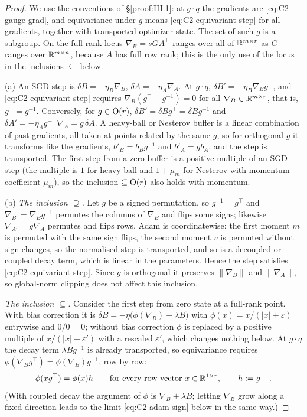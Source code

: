 \begin{proof}
We use the conventions of \S\ref{proof:III.1}: at $g\cdot q$ the gradients are \eqref{eq:C2-gauge-grad}, and equivariance
under $g$ means \eqref{eq:C2-equivariant-step} for all gradients, together with transported optimizer state. The set of
such $g$ is a subgroup. On the full-rank locus $\nabla_B=sGA^\top$ ranges over all of $\R^{m\times r}$ as $G$ ranges over
$\R^{m\times n}$, because $A$ has full row rank; this is the only use of the locus in the inclusions $\subseteq$ below.

(a) An SGD step is $\delta B=-\eta_B\nabla_B$, $\delta A=-\eta_A\nabla_A$. At $g\cdot q$,
$\delta B'=-\eta_B\nabla_Bg^\top$, and \eqref{eq:C2-equivariant-step} requires $\nabla_B(g^\top-g^{-1})=0$ for all
$\nabla_B\in\R^{m\times r}$, that is, $g^\top=g^{-1}$. Conversely, for $g\in\Ort(r)$, $\delta B'=\delta Bg^\top=\delta Bg^{-1}$
and $\delta A'=-\eta_Ag^{-\top}\nabla_A=g\,\delta A$. A heavy-ball or Nesterov buffer is a linear combination of past
gradients, all taken at points related by the same $g$, so for orthogonal $g$ it transforms like the gradients, $b'_B=b_Bg^{-1}$
and $b'_A=gb_A$, and the step is transported. The first step from a zero buffer is a positive multiple of an SGD step (the multiple is $1$ for heavy ball
and $1+\mu_m$ for Nesterov with momentum coefficient $\mu_m$), so the inclusion $\subseteq\Ort(r)$ also holds with momentum.

(b) \emph{The inclusion $\supseteq$.} Let $g$ be a signed permutation, so $g^{-1}=g^\top$ and $\nabla_{B'}=\nabla_Bg^{-1}$
permutes the columns of $\nabla_B$ and flips some signs; likewise $\nabla_{A'}=g\nabla_A$ permutes and flips rows. Adam is
coordinatewise: the first moment $m$ is permuted with the same sign flips, the second moment $v$ is permuted without sign
changes, so the normalised step is transported, and so is a decoupled or coupled decay term, which is linear in the
parameters. Hence the step satisfies \eqref{eq:C2-equivariant-step}. Since $g$ is orthogonal it preserves
$\lVert\nabla_B\rVert$ and $\lVert\nabla_A\rVert$, so global-norm clipping does not affect this inclusion.

\emph{The inclusion $\subseteq$.} Consider the first step from zero state at a full-rank point. With bias correction it is
$\delta B=-\eta\big(\phi(\nabla_B)+\lambda B\big)$ with $\phi(x)=x/(\lvert x\rvert+\varepsilon)$ entrywise and $0/0=0$;
without bias correction $\phi$ is replaced by a positive multiple of $x/(\lvert x\rvert+\varepsilon')$ with a rescaled
$\varepsilon'$, which changes nothing below. At $g\cdot q$ the decay term $\lambda Bg^{-1}$ is already transported, so
equivariance requires $\phi(\nabla_Bg^\top)=\phi(\nabla_B)g^{-1}$, row by row:
\begin{equation}\label{eq:C2-adam-row}
\phi(xg^\top)=\phi(x)h\qquad\text{for every row vector }x\in\R^{1\times r},\qquad h:=g^{-1}.
\end{equation}
(With coupled decay the argument of $\phi$ is $\nabla_B+\lambda B$; letting $\nabla_B$ grow along a fixed direction leads
to the limit \eqref{eq:C2-adam-sign} below in the same way.)


\end{proof}
